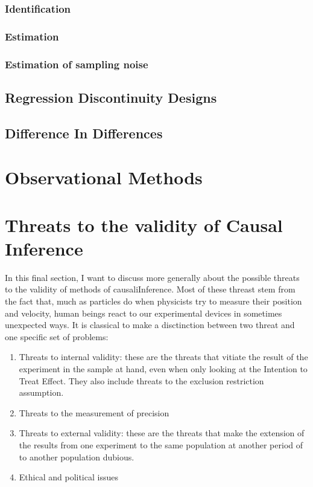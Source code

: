 \documentclass[]{book}
\providecommand{\tightlist}{%
  \setlength{\itemsep}{0pt}\setlength{\parskip}{0pt}}
\theoremstyle{definition}
\theoremstyle{definition}
\theoremstyle{definition}
\theoremstyle{remark}
\begin{document}
\subsection{Identification}\label{identification-4}

\subsection{Estimation}\label{estimation}

\subsection{Estimation of sampling
noise}\label{estimation-of-sampling-noise}

\section{Regression Discontinuity
Designs}\label{regression-discontinuity-designs}

\section{Difference In Differences}\label{difference-in-differences}

\chapter{Observational Methods}\label{sec:OM}

\chapter{Threats to the validity of Causal Inference}\label{sec:threats}

In this final section, I want to discuss more generally about the
possible threats to the validity of methods of causaliInference. Most of
these threast stem from the fact that, much as particles do when
physicists try to measure their position and velocity, human beings
react to our experimental devices in sometimes unexpected ways. It is
classical to make a disctinction between two threat and one specific set
of problems:

\begin{enumerate}
\def\labelenumi{\arabic{enumi}.}
\tightlist
\item
  Threats to internal validity: these are the threats that vitiate the
  result of the experiment in the sample at hand, even when only looking
  at the Intention to Treat Effect. They also include threats to the
  exclusion restriction assumption.
\item
  Threats to the measurement of precision
\item
  Threats to external validity: these are the threats that make the
  extension of the results from one experiment to the same population at
  another period of to another population dubious.
\item
  Ethical and political issues
\end{enumerate}
\end{document}

